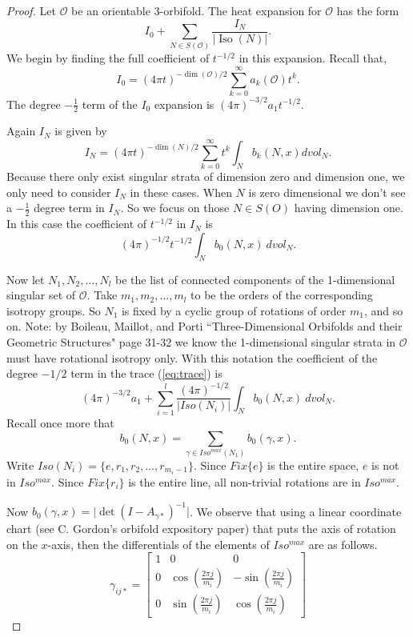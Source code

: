 \documentclass[12pt]{article}
\newcommand{\myabs}[1]{\vert#1\vert}
\theoremstyle{definition}
\DeclareMathOperator{\iso}{Iso}
\begin{document}
\begin{proof} Let $\mathcal{O}$ be an orientable 3-orbifold. The heat expansion for $\mathcal{O}$ has the form
$$I_0+\sum_{N \in S(\mathcal{O})}\frac{I_N}{\myabs{\iso(N)}}.$$  
We begin by finding the full coefficient of $t^{-1/2}$ in this expansion.
Recall that,
$$I_0 = {(4\pi t)}^{-\dim(\mathcal{O})/2}\sum_{k=0}^{\infty}a_k(\mathcal{O})t^k.$$
The degree  $-\frac{1}{2}$ term of the $I_0$ expansion is $(4\pi)^{-3/2}a_1t^{-1/2}$.

Again $I_N$ is given by
$$I_N= {(4\pi t)}^{-\dim(N)/2}\sum_{k=0}^{\infty}t^k\int_{N}b_k(N,x)dvol_N.$$
Because there only exist singular strata of dimension zero and dimension one, we only need to consider $I_N$ in these cases.  When $N$ is zero dimensional we don't see a $-\frac{1}{2}$ degree term in $I_N$.  So we focus on those $N \in S(O)$ having dimension one.  In this case the coefficient of $t^{-1/2}$ in $I_N$ is 
$$(4\pi)^{-1/2}t^{-1/2}\int_N b_0(N, x) \ dvol_N.$$

Now let $N_1, N_2, \dots, N_l$ be the list of connected components of the 1-dimensional singular set of $\mathcal{O}$. Take $m_1, m_2, \dots, m_l$ to be the orders of the corresponding isotropy groups.  So $N_1$ is fixed by a cyclic group of rotations of order $m_1$, and so on.  Note:  by Boileau, Maillot, and Porti ``Three-Dimensional Orbifolds and their Geometric Structures" page 31-32 we know the 1-dimensional singular strata in $\mathcal{O}$ must have rotational isotropy only.  With this notation the coefficient of the degree $-1/2$ term in the trace (\ref{eq:trace}) is
$$(4\pi)^{-3/2}a_1 + \sum_{i=1}^{l} \frac{(4\pi)^{-1/2}}{|Iso(N_i)|}\int_N b_0(N, x) \ dvol_N.$$
Recall once more that $$b_0(N, x) = \sum_{\gamma \in Iso^{max}(N_1)} b_0(\gamma,x).$$
Write $Iso(N_i)=\{e, r_1, r_2, \dots, r_{m_i-1}\}$. Since $Fix\{e\}$ is the entire space, $e$ is not in $Iso^{max}$.  Since $Fix\{r_i\}$ is the entire line, all non-trivial rotations are in $Iso^{max}$.

Now $b_0(\gamma,x)=\myabs{\det(I-A_{\gamma*})^{-1}}$.  We observe that using a linear coordinate chart (see C. Gordon's orbifold expository paper) that puts the axis of rotation on the $x$-axis, then the differentials of the elements of $Iso^{max}$ are as follows.
$$\gamma_{ij*} = \begin{bmatrix} 1 & 0 & 0 \\ 0  & \cos(\frac{2\pi j}{m_i}) & -\sin(\frac{2\pi j}{m_i}) \\ 0 & \sin(\frac{2\pi j}{m_i}) & \cos(\frac{2\pi j}{m_i}) \end{bmatrix}$$


\end{proof}
\end{document}
